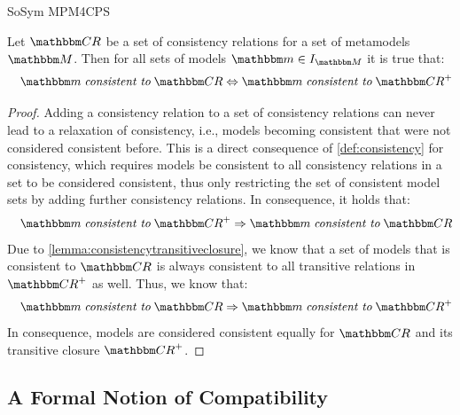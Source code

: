 \begin{copiedFrom}{SoSym MPM4CPS}
\begin{lemma} \label{lemma:consistencytransitiveclosure}
    Let $\consistencyrelationset{CR}$ be a set of consistency relations for a set of metamodels $\metamodelset{M}$.
    Then for all sets of models $\modelset{m} \in \metamodelinstances{\metamodelset{M}}$ it is true that:
    \begin{align*}
        \formulaskip
        \modelset{m} \mathtext{consistent to} \consistencyrelationset{CR} \equivalent
        \modelset{m} \mathtext{consistent to} \transitiveclosure{\consistencyrelationset{CR}}
    \end{align*}
\end{lemma}

\begin{proof}
    Adding a consistency relation to a set of consistency relations can never lead to a relaxation of consistency, i.e., models becoming consistent that were not considered consistent before. This is a direct consequence of \autoref{def:consistency} for consistency, which requires models be consistent to all consistency relations in a set to be considered consistent, thus only restricting the set of consistent model sets by adding further consistency relations.
    In consequence, it holds that:
    \begin{align*}
        \formulaskip
        \modelset{m} \mathtext{consistent to} \transitiveclosure{\consistencyrelationset{CR}} \Rightarrow \modelset{m} \mathtext{consistent to} \consistencyrelationset{CR}
    \end{align*}
    Due to \autoref{lemma:consistencytransitiveclosure}, we know that a set of models that is consistent to $\consistencyrelationset{CR}$ is always consistent to all transitive relations in $\transitiveclosure{\consistencyrelationset{CR}}$ as well. Thus, we know that:
    \begin{align*}
        \formulaskip
        \modelset{m} \mathtext{consistent to} \consistencyrelationset{CR} \Rightarrow
        \modelset{m} \mathtext{consistent to} \transitiveclosure{\consistencyrelationset{CR}}
    \end{align*}
    In consequence, models are considered consistent equally for $\consistencyrelationset{CR}$ and its transitive closure $\transitiveclosure{\consistencyrelationset{CR}}$.
\end{proof}


\subsection{A Formal Notion of Compatibility}


\end{copiedFrom}
